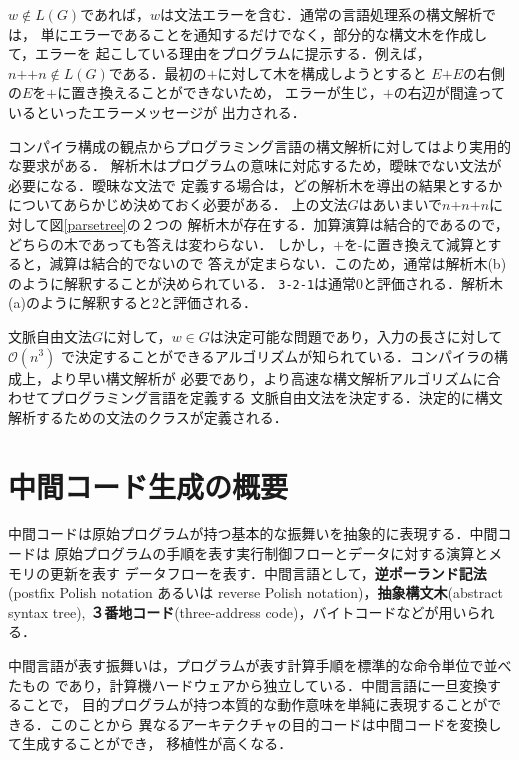 \documentclass[dvipdfmx,a4j]{jbook}
\begin{document}
$w\notin L(G)$であれば，$w$は文法エラーを含む．通常の言語処理系の構文解析では，
単にエラーであることを通知するだけでなく，部分的な構文木を作成して，エラーを
起こしている理由をプログラムに提示する．例えば，$n\texttt{+}\texttt{+}n\notin
L(G)$である．最初の$\texttt{+}$に対して木を構成しようとすると
$E\texttt{+}E$の右側の$E$を$\texttt{+}$に置き換えることができないため，
エラーが生じ，$\texttt{+}$の右辺が間違っているといったエラーメッセージが
出力される．

コンパイラ構成の観点からプログラミング言語の構文解析に対してはより実用的な要求がある．
解析木はプログラムの意味に対応するため，曖昧でない文法が必要になる．曖昧な文法で
定義する場合は，どの解析木を導出の結果とするかについてあらかじめ決めておく必要がある．
上の文法$G$はあいまいで$n\texttt{+}n\texttt{+}n$に対して図\ref{parsetree}の２つの
解析木が存在する．加算演算は結合的であるので，どちらの木であっても答えは変わらない．
しかし，$\texttt{+}$を$\texttt{-}$に置き換えて減算とすると，減算は結合的でないので
答えが定まらない．このため，通常は解析木(b)のように解釈することが決められている．
\texttt{3-2-1}は通常0と評価される．解析木(a)のように解釈すると2と評価される．

文脈自由文法$G$に対して，$w\in G$は決定可能な問題であり，入力の長さに対して$\mathcal{O}(n^3)$
で決定することができるアルゴリズムが知られている．コンパイラの構成上，より早い構文解析が
必要であり，より高速な構文解析アルゴリズムに合わせてプログラミング言語を定義する
文脈自由文法を決定する．決定的に構文解析するための文法のクラスが定義される．

\section{中間コード生成の概要}

中間コードは原始プログラムが持つ基本的な振舞いを抽象的に表現する．中間コードは
原始プログラムの手順を表す実行制御フローとデータに対する演算とメモリの更新を表す
データフローを表す．中間言語として，{\bf 逆ポーランド記法}(postfix Polish notation
あるいは reverse Polish notation)，{\bf 抽象構文木}(abstract syntax tree), 
{\bf ３番地コード}(three-address code)，バイトコードなどが用いられる．

中間言語が表す振舞いは，プログラムが表す計算手順を標準的な命令単位で並べたもの
であり，計算機ハードウェアから独立している．中間言語に一旦変換することで，
目的プログラムが持つ本質的な動作意味を単純に表現することができる．このことから
異なるアーキテクチャの目的コードは中間コードを変換して生成することができ，
移植性が高くなる．
\end{document}
